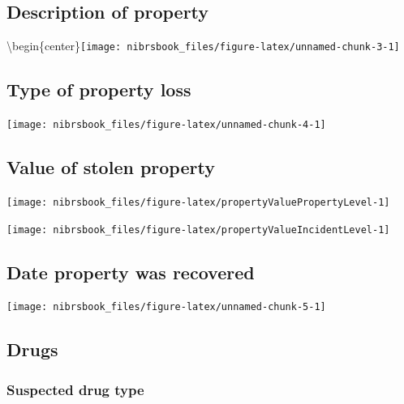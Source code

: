 \documentclass[
  12pt,
  openany]{book}
\begin{document}
\hypertarget{description-of-property}{%
\subsection{Description of property}\label{description-of-property}}

\textbackslash begin\{center\}\texttt{[image: nibrsbook\_files/figure-latex/unnamed-chunk-3-1]}

\hypertarget{type-of-property-loss}{%
\subsection{Type of property loss}\label{type-of-property-loss}}

\begin{center}\texttt{[image: nibrsbook\_files/figure-latex/unnamed-chunk-4-1]} \end{center}

\hypertarget{value-of-stolen-property}{%
\subsection{Value of stolen property}\label{value-of-stolen-property}}

\begin{center}\texttt{[image: nibrsbook\_files/figure-latex/propertyValuePropertyLevel-1]} \end{center}

\begin{center}\texttt{[image: nibrsbook\_files/figure-latex/propertyValueIncidentLevel-1]} \end{center}

\hypertarget{date-property-was-recovered}{%
\subsection{Date property was recovered}\label{date-property-was-recovered}}

\begin{center}\texttt{[image: nibrsbook\_files/figure-latex/unnamed-chunk-5-1]} \end{center}

\hypertarget{drugs}{%
\subsection{Drugs}\label{drugs}}

\hypertarget{suspected-drug-type}{%
\subsubsection{Suspected drug type}\label{suspected-drug-type}}
\end{document}
